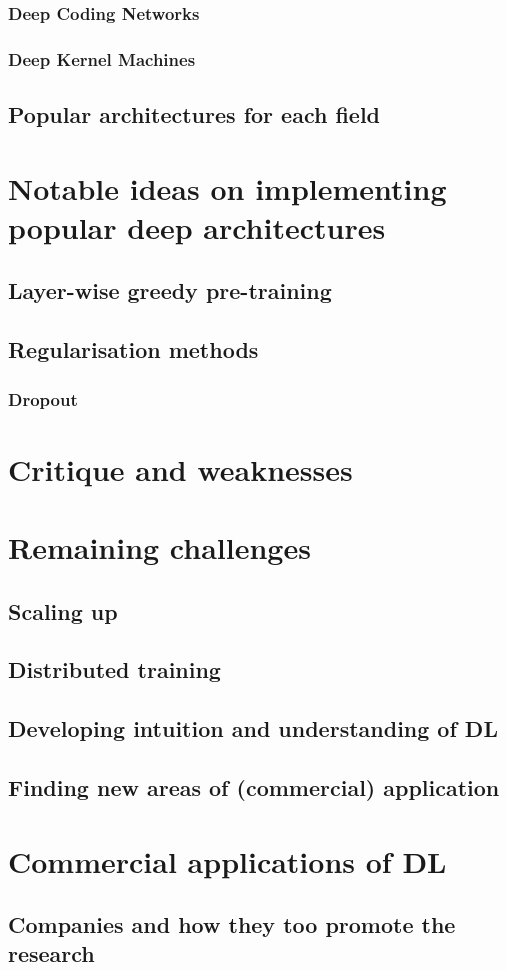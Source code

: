 \documentclass[a4paper]{report}
\begin{document}
		\subsubsection{Deep Coding Networks}
		\subsubsection{Deep Kernel Machines}
	\subsection{Popular architectures for each field}
\section{Notable ideas on implementing popular deep architectures}
	\subsection{Layer-wise greedy pre-training}
	\subsection{Regularisation methods}
		\subsubsection{Dropout}
\section{Critique and weaknesses}
\section{Remaining challenges}
	\subsection{Scaling up}
	\subsection{Distributed training}
	\subsection{Developing intuition and understanding of DL}
	\subsection{Finding new areas of (commercial) application}
\section{Commercial applications of DL}
	\subsection{Companies and how they too promote the research}
	
	
	
	
\end{document}
